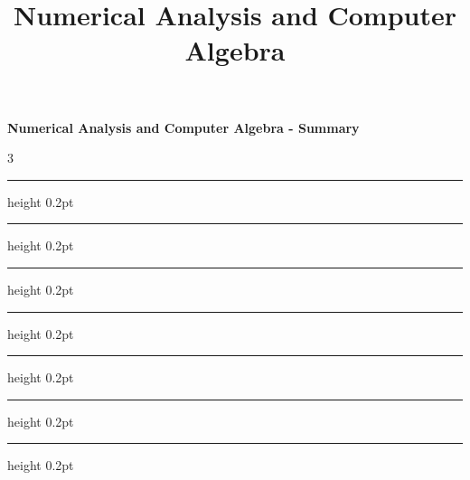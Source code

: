 \documentclass[10pt,landscape]{article}
\title{Numerical Analysis and Computer Algebra}
\renewcommand{\hrulefill}{\leavevmode\leaders\hrule height 0.2pt \hfill\kern0pt\relax}
\begin{document}
    \raggedright
    \footnotesize

    \begin{center}
        \textbf{Numerical Analysis and Computer Algebra - Summary} \\
    \end{center}
    \begin{multicols}{3}
        \setlength{\premulticols}{1pt}
        \setlength{\postmulticols}{1pt}
        \setlength{\multicolsep}{1pt}
        \setlength{\columnsep}{2pt}

        

        \hrulefill
        \hspace{.5cm}

        

        \hrulefill
        \hspace{.5cm}

        

        \hrulefill
        \hspace{.5cm}

        

        \hrulefill
        \hspace{.5cm}

        

        \hrulefill
        \hspace{.5cm}

        

        \hrulefill
        \hspace{.5cm}

        

        \hrulefill
        \hspace{.5cm}

        \newpage

        {\color{darkgray}}
    \end{multicols}
\end{document}
